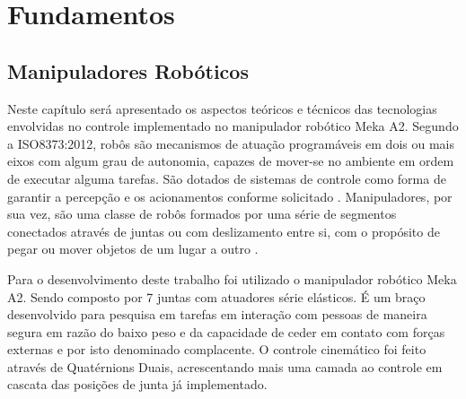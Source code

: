 \chapter{Fundamentos}\label{ch:teory-reference}





\section{Manipuladores Robóticos} 

Neste capítulo será apresentado os aspectos teóricos e técnicos das tecnologias envolvidas no controle implementado no manipulador robótico Meka A2. Segundo a ISO8373:2012, robôs são mecanismos de atuação programáveis em dois ou mais eixos com algum grau de autonomia, capazes de mover-se no ambiente em ordem de executar alguma tarefas. São dotados de sistemas de controle como forma de garantir a percepção e os acionamentos conforme solicitado \cite{nobody}. Manipuladores, por sua vez, são uma classe de robôs formados por uma série de segmentos conectados através de juntas ou com deslizamento entre si, com o propósito de pegar ou mover objetos de um lugar a outro \cite{nobody}.

Para o desenvolvimento deste trabalho foi utilizado o manipulador robótico Meka A2. Sendo composto por 7 juntas com atuadores série elásticos. É um braço desenvolvido para pesquisa em tarefas em interação com pessoas de maneira segura em razão do baixo peso e da capacidade de ceder em contato com forças externas e por isto denominado complacente. O controle cinemático foi feito através de Quatérnions Duais, acrescentando mais uma camada ao controle em cascata das posições de junta já implementado.

